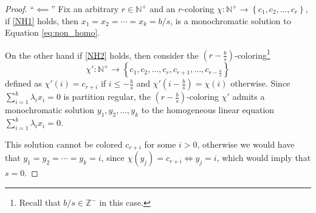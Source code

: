 \begin{proof}
	``$\impliedby$'' Fix an arbitrary $r \in \mathbb{N}^{+}$ and an $r$-coloring $\chi: \mathbb{N}^+ \to \left\{c_1, c_2, \ldots, c_{r}\right\}$, if \ref{NH1} holds, then $x_1 = x_2 = \cdots = x_k = b / s$, is a monochromatic solution to Equation \eqref{eq:non_homo}.

	On the other hand if \ref{NH2} holds, then consider the $\left(r - \frac{b}{s}\right)$-coloring\footnote{Recall that $b / s \in \mathbb{Z}^{-}$ in this case.}
	\begin{equation*}
		\chi': \mathbb{N}^+ \to \left\{c_1, c_2, \ldots, c_{r}, c_{r + 1}, \ldots, c_{r - \frac{b}{s}}\right\}
	\end{equation*}
	defined as $\chi'(i) = c_{r + i}$ if $i \leq - \frac{b}{s}$ and $\chi'\left(i -  \frac{b}{s}\right) = \chi(i)$ otherwise.
	Since $\sum_{i = 1}^k \lambda_i x_{i} = 0$ is partition regular, the $\left(r - \frac{b}{s}\right)$-coloring $\chi'$ admits a monochromatic solution $y_1, y_2, \ldots, y_k$ to the homogeneous linear equation $\sum_{i = 1}^k \lambda_i x_i = 0$.

	This solution cannot be colored $c_{r + i}$ for some $i > 0$, otherwise we would have that $y_1 = y_2 = \cdots = y_{k} = i$, since $\chi(y_{j}) = c_{r + i} \iff y_{j} = i$, which would imply that $s = 0$.


\end{proof}
